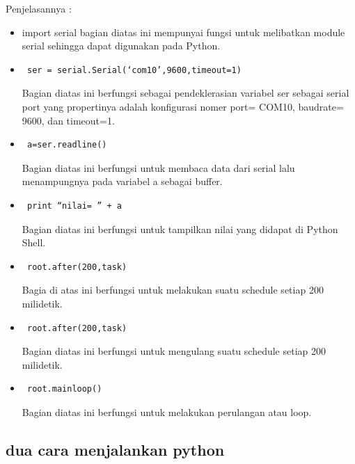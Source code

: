 		Penjelasannya : 
		\begin{itemize}
			\item import serial
			bagian diatas ini mempunyai fungsi untuk melibatkan module serial sehingga dapat digunakan pada Python.
			
			\item \begin{verbatim} ser = serial.Serial(‘com10’,9600,timeout=1)\end{verbatim}
			Bagian diatas ini berfungsi sebagai pendeklerasian variabel ser sebagai serial port yang propertinya adalah konfigurasi nomer port= COM10, baudrate= 9600, dan timeout=1.
			\item \begin{verbatim} a=ser.readline() \end{verbatim}
			Bagian diatas ini berfungsi untuk membaca data dari serial lalu menampungnya pada variabel a sebagai buffer.
			\item \begin{verbatim} print “nilai= ” + a \end{verbatim} 
			Bagian diatas ini berfungsi untuk tampilkan nilai yang didapat di Python Shell. 
			\item \begin{verbatim} root.after(200,task) \end{verbatim}
			Bagia di atas ini berfungsi untuk melakukan suatu schedule setiap 200 milidetik.
			\item \begin{verbatim} root.after(200,task)	\end{verbatim}
			Bagian diatas ini berfungsi untuk mengulang suatu schedule setiap 200 milidetik.
			\item \begin{verbatim} root.mainloop() \end{verbatim}
			Bagian diatas ini berfungsi untuk melakukan perulangan atau loop.
		\end{itemize}
	
	\cite{nurjanahhack}
	\cite{rossum1995python}

\subsection{dua cara menjalankan python}
  
